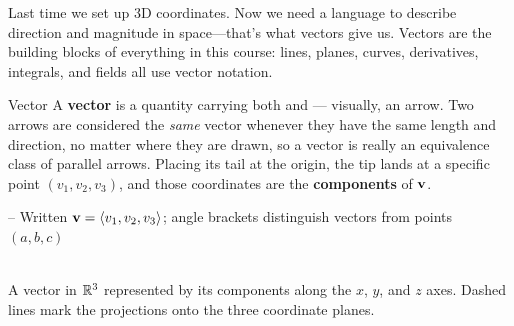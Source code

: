 \documentclass[11pt]{article}
\begin{document}

\begin{background}
Last time we set up 3D coordinates. Now we need a language to describe direction and magnitude in space---that's what vectors give us. Vectors are the building blocks of everything in this course: lines, planes, curves, derivatives, integrals, and fields all use vector notation.
\end{background}


\begin{defbox}{Vector}
A \textbf{vector} is a quantity carrying both  and  — visually, an arrow. Two arrows are considered the \emph{same} vector whenever they have the same length and direction, no matter where they are drawn, so a vector is really an equivalence class of parallel arrows. Placing its tail at the origin, the tip lands at a specific point $(v_1,v_2,v_3)$, and those coordinates are the \textbf{components} of $\mathbf{v}$.

\medskip
-- Written $\mathbf{v} = \left\langle v_1, v_2, v_3 \right\rangle$; angle brackets distinguish vectors from points $(a,b,c)$
\end{defbox}

\begin{center}
\\
{\small A vector in $\mathbb{R}^3$ represented by its components along the $x$, $y$, and $z$ axes. Dashed lines mark the projections onto the three coordinate planes.}
\end{center}
\end{document}
